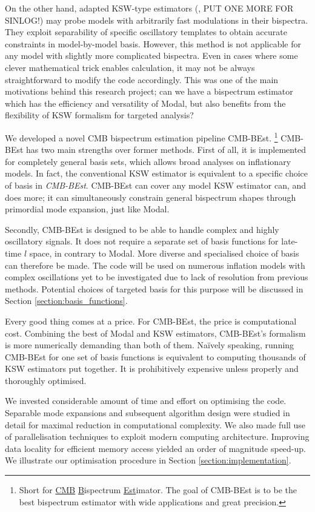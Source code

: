 On the other hand, adapted KSW-type estimators (\cite{Munchmeyer2014}, PUT ONE MORE FOR SINLOG!) may probe models with arbitrarily fast modulations in their bispectra. They exploit separability of specific oscillatory templates to obtain accurate constraints in model-by-model basis. However, this method is not applicable for any model with slightly more complicated bispectra. Even in cases where some clever mathematical trick enables calculation, it may not be always straightforward to modify the code accordingly. This was one of the main motivations behind this research project; can we have a bispectrum estimator which has the efficiency and versatility of Modal, but also benefits from the flexibility of KSW formalism for targeted analysis?

We developed a novel CMB bispectrum estimation pipeline CMB-BEst. \footnote{Short for \underline{CMB} \underline{B}ispectrum \underline{Est}imator. The goal of CMB-BEst is to be the best bispectrum estimator with wide applications and great precision.} CMB-BEst has two main strengths over former methods. First of all, it is implemented for completely general basis sets, which allows broad analyses on inflationary models. In fact, the conventional KSW estimator is equivalent to a specific choice of basis in \textit{CMB-BEst}. CMB-BEst can cover any model KSW estimator can, and does more; it can simultaneously constrain general bispectrum shapes through primordial mode expansion, just like Modal.

Secondly, CMB-BEst is designed to be able to handle complex and highly oscillatory signals. It does not require a separate set of basis functions for late-time $l$ space, in contrary to Modal. More diverse and specialised choice of basis can therefore be made. The code will be used on numerous inflation models with complex oscillations yet to be investigated due to lack of resolution from previous methods. Potential choices of targeted basis for this purpose will be discussed in Section \ref{section:basis_functions}.

Every good thing comes at a price. For CMB-BEst, the price is computational cost. Combining the best of Modal and KSW estimators, CMB-BEst's formalism is more numerically demanding than both of them. Na\"ively speaking, running CMB-BEst for one set of basis functions is equivalent to computing thousands of KSW estimators put together. It is prohibitively expensive unless properly and thoroughly optimised.

We invested considerable amount of time and effort on optimising the code. Separable mode expansions and subsequent algorithm design were studied in detail for maximal reduction in computational complexity. We also made full use of parallelisation techniques to exploit modern computing architecture. Improving data locality for efficient memory access yielded an order of magnitude speed-up. We illustrate our optimisation procedure in Section \ref{section:implementation}.

